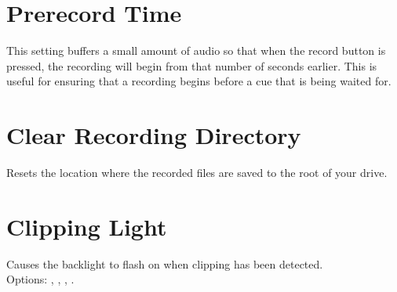 \section{Prerecord Time}
    This setting buffers a small amount of audio so that when the record button
    is pressed, the recording will begin from that number of seconds earlier.
    This is useful for ensuring that a recording begins before a cue that is
    being waited for.

\section{Clear Recording Directory}
    Resets the location where the recorded files are saved to the root of your
    \daps{} drive.

\section{Clipping Light}
    Causes the backlight to flash on when clipping has been detected.\\
    Options: , ,
    , .

